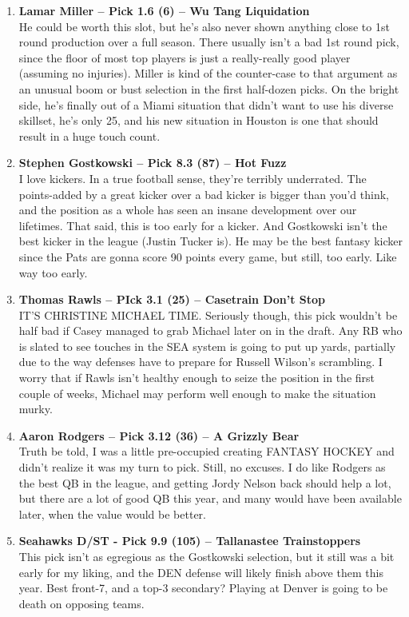 \documentclass[11pt,letterpaper]{article}
\begin{document}
\begin{enumerate}
\item \textbf{Lamar Miller -- Pick 1.6 (6) -- Wu Tang Liquidation}
\\He could be worth this slot, but he's also never shown anything close to 1st round production over a full season. There usually isn't a bad 1st round pick, since the floor of most top players is just a really-really good player (assuming no injuries). Miller is kind of the counter-case to that argument as an unusual boom or bust selection in the first half-dozen picks. On the bright side, he's finally out of a Miami situation that didn't want to use his diverse skillset, he's only 25, and his new situation in Houston is one that should result in a huge touch count.

\item \textbf{Stephen Gostkowski -- Pick 8.3 (87) -- Hot Fuzz}
\\I love kickers. In a true football sense, they're terribly underrated. The points-added by a great kicker over a bad kicker is bigger than you'd think, and the position as a whole has seen an insane development over our lifetimes. That said, this is too early for a kicker. And Gostkowski isn't the best kicker in the league (Justin Tucker is). He may be the best fantasy kicker since the Pats are gonna score 90 points every game, but still, too early. Like way too early. 

\item \textbf{Thomas Rawls -- PIck 3.1 (25) -- Casetrain Don't Stop}
\\IT'S CHRISTINE MICHAEL TIME. Seriously though, this pick wouldn't be half bad if Casey managed to grab Michael later on in the draft. Any RB who is slated to see touches in the SEA system is going to put up yards, partially due to the way defenses have to prepare for Russell Wilson's scrambling. I worry that if Rawls isn't healthy enough to seize the position in the first couple of weeks, Michael may perform well enough to make the situation murky.

\item \textbf{Aaron Rodgers -- Pick 3.12 (36) -- A Grizzly Bear}
\\Truth be told, I was a little pre-occupied creating FANTASY HOCKEY and didn't realize it was my turn to pick. Still, no excuses. I do like Rodgers as the best QB in the league, and getting Jordy Nelson back should help a lot, but there are a lot of good QB this year, and many would have been available later, when the value would be better.

\item \textbf{Seahawks D/ST - Pick 9.9 (105) -- Tallanastee Trainstoppers}
\\This pick isn't as egregious as the Gostkowski selection, but it still was a bit early for my liking, and the DEN defense will likely finish above them this year. Best front-7,  and a top-3 secondary? Playing at Denver is going to be death on opposing teams.
\end{enumerate}
\end{document}
